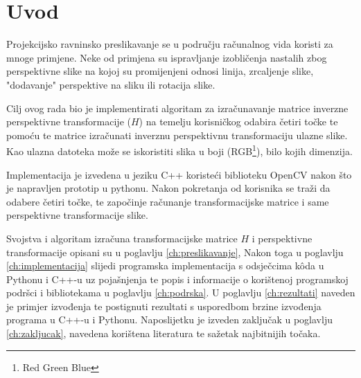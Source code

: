 \chapter{Uvod}
\label{ch:uvod}

Projekcijsko ravninsko preslikavanje se u području računalnog vida koristi za mnoge primjene. Neke od primjena su ispravljanje izobličenja nastalih zbog perspektivne slike na kojoj su promijenjeni odnosi linija, zrcaljenje slike, "dodavanje" perspektive na sliku ili rotacija slike.

Cilj ovog rada bio je implementirati algoritam za izračunavanje matrice inverzne perspektivne transformacije ($H$) na temelju korisničkog odabira četiri točke te pomoću te matrice izračunati inverznu perspektivnu transformaciju ulazne slike. Kao ulazna datoteka može se iskoristiti slika u boji (RGB\footnote{Red Green Blue}), bilo kojih dimenzija.

Implementacija je izvedena u jeziku C++ koristeći biblioteku OpenCV nakon što je napravljen prototip u pythonu. Nakon pokretanja od korisnika se traži da odabere četiri točke, te započinje računanje transformacijske matrice i same perspektivne transformacije slike.

Svojstva i algoritam izračuna transformacijske matrice $H$ i perspektivne transformacije opisani su u poglavlju \ref{ch:preslikavanje}, Nakon toga u poglavlju \ref{ch:implementacija} slijedi programska implementacija s odsječcima kôda u Pythonu i C++-u uz pojašnjenja te popis i informacije o korištenoj programskoj podršci i bibliotekama u poglavlju \ref{ch:podrska}. U poglavlju \ref{ch:rezultati} naveden je primjer izvođenja te postignuti rezultati s usporedbom brzine izvođenja programa u C++-u i Pythonu. Naposlijetku je izveden zaključak u poglavlju \ref{ch:zakljucak}, navedena korištena literatura te sažetak najbitnijih točaka.